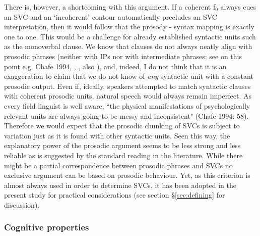 There is, however, a shortcoming with this argument. If a coherent f$_0$ always cues an SVC and an `incoherent' contour automatically precludes an SVC interpretation, then it would follow that the prosody - syntax mapping is exactly one to one. This would be a challenge for already established syntactic units such as the monoverbal clause. We know that clauses do not always neatly align with prosodic phrases (neither with \acs{IP}s nor with intermediate phrases; see on this point e.g. Chafe 1994, \cite{himmelmann2006challenges}, \cite{ladd2008intonational}, also \cite{engelhardt2010}), and, indeed, I do not think that it is an exaggeration to claim that we do not know of \emph{any} syntactic unit with a constant prosodic output. Even if, ideally, speakers attempted to match syntactic clauses with coherent prosodic units, natural speech would always remain imperfect. As every field linguist is well aware, ``the physical manifestations of psychologically relevant units are always going to be messy and inconsistent" (Chafe 1994: 58). Therefore we would expect that the prosodic chunking of SVCs is subject to variation just as it is found with other syntactic units. Seen this way, the explanatory power of the prosodic argument seems to be less strong and less reliable as is suggested by the standard reading in the literature. While there might be a partial correspondence between prosodic phrases and SVCs no exclusive argument can be based on prosodic behaviour. Yet, as this criterion is almost always used in order to determine SVCs, it has been adopted in the present study for practical considerations (see section §\ref{sec:defining} for discussion).

\subsubsection{Cognitive properties} \label{sec:cognitive}

